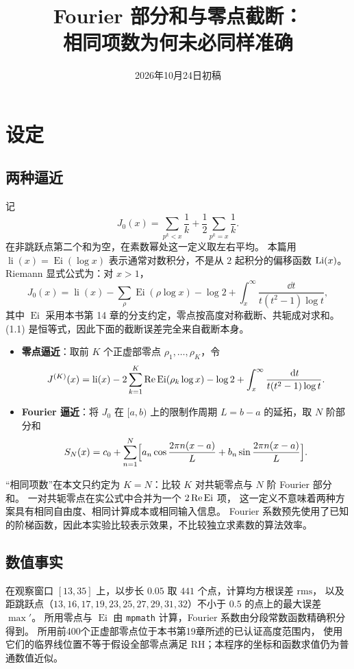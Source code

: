 \documentclass[11pt]{article}
\date{2026年10月24日初稿}
\title{Fourier 部分和与零点截断：\\相同项数为何未必同样准确}
\newcommand{\Ei}{\operatorname{Ei}}
\newcommand{\li}{\operatorname{li}}
\begin{document}
\maketitle

\par\medskip

\section{设定}
\subsection{两种逼近}
记
\[
 J_0(x)=\sum_{p^k<x}\frac1k+\frac12\sum_{p^k=x}\frac1k.
\]
在非跳跃点第二个和为空，在素数幂处这一定义取左右平均。
本篇用 $\li(x)=\Ei(\log x)$ 表示通常对数积分，不是从 $2$ 起积分的偏移函数 $\operatorname{Li}(x)$。
Riemann 显式公式为：对 $x>1$，
\[
 J_0(x)=\li(x)-\sum_\rho\Ei(\rho\log x)-\log2+\int_x^\infty\frac{\dd t}{t(t^2-1)\log t},       \tag{1.1}
\]
其中 $\Ei$ 采用本书第 14 章的分支约定，零点按高度对称截断、共轭成对求和。
(1.1) 是恒等式，因此下面的截断误差完全来自截断本身。

\begin{itemize}
 \item \textbf{零点逼近}：取前 $K$ 个正虚部零点 $\rho_1,\ldots,\rho_K$，令
 \[
  J^{(K)}(x)=\li(x)-2\sum_{k=1}^K\Rea\Ei(\rho_k\log x)-\log2+\int_x^\infty\frac{\dd t}{t(t^2-1)\log t}.
 \]
 \item \textbf{Fourier 逼近}：将 $J_0$ 在 $[a,b)$ 上的限制作周期 $L=b-a$ 的延拓，取 $N$ 阶部分和
 \[
  S_N(x)=c_0+\sum_{n=1}^N\Bigl[a_n\cos\frac{2\pi n(x-a)}L+b_n\sin\frac{2\pi n(x-a)}L\Bigr].
 \]
\end{itemize}
“相同项数”在本文只约定为 $K=N$：比较 $K$ 对共轭零点与 $N$ 阶 Fourier 部分和。
一对共轭零点在实公式中合并为一个 $2\Rea\Ei$ 项，
这一定义不意味着两种方案具有相同自由度、相同计算成本或相同输入信息。
Fourier 系数预先使用了已知的阶梯函数，因此本实验比较表示效果，不比较独立求素数的算法效率。

\subsection{数值事实}
在观察窗口 $[13,35]$ 上，以步长 $0.05$ 取 $441$ 个点，计算均方根误差 $\mathrm{rms}$，
以及距跳跃点（$13,16,17,19,23,25,27,29,31,32$）不小于 $0.5$ 的点上的最大误差 $\max'$。
所用零点与 $\Ei$ 由 \texttt{mpmath} 计算，Fourier 系数由分段常数函数精确积分得到。
所用前400个正虚部零点位于本书第19章所述的已认证高度范围内，
使用它们的临界线位置不等于假设全部零点满足 RH；本程序的坐标和函数求值仍为普通数值近似。
\end{document}
